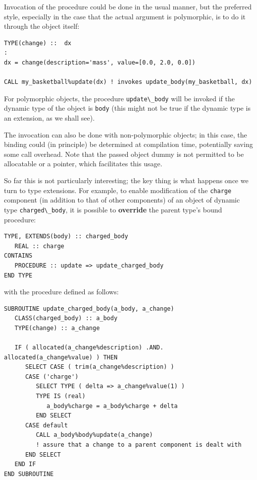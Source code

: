 \documentclass[
  paper=a4,
  ,captions=tableheading
]{scrartcl}
\newcommand{\passthrough}[1]{#1}
\begin{document}
Invocation of the procedure could be done in the usual manner, but the
preferred style, especially in the case that the actual argument is
polymorphic, is to do it through the object itself:

\begin{lstlisting}
TYPE(change) ::  dx
:
dx = change(description='mass', value=[0.0, 2.0, 0.0])

CALL my_basketball%update(dx) ! invokes update_body(my_basketball, dx)
\end{lstlisting}

For polymorphic objects, the procedure
\passthrough{\lstinline!update\_body!} will be invoked if the dynamic
type of the object is \passthrough{\lstinline!body!} (this might not be
true if the dynamic type is an extension, as we shall see).

The invocation can also be done with non-polymorphic objects; in this
case, the binding could (in principle) be determined at compilation
time, potentially saving some call overhead. Note that the passed object
dummy is not permitted to be allocatable or a pointer, which facilitates
this usage.

So far this is not particularly interesting; the key thing is what
happens once we turn to type extensions. For example, to enable
modification of the \passthrough{\lstinline!charge!} component (in
addition to that of other components) of an object of dynamic type
\passthrough{\lstinline!charged\_body!}, it is possible to
\textbf{override} the parent type's bound procedure:

\begin{lstlisting}
TYPE, EXTENDS(body) :: charged_body
   REAL :: charge
CONTAINS
   PROCEDURE :: update => update_charged_body
END TYPE
\end{lstlisting}

with the procedure defined as follows:

\begin{lstlisting}
SUBROUTINE update_charged_body(a_body, a_change)
   CLASS(charged_body) :: a_body
   TYPE(change) :: a_change

   IF ( allocated(a_change%description) .AND. allocated(a_change%value) ) THEN
      SELECT CASE ( trim(a_change%description) )
      CASE ('charge')
         SELECT TYPE ( delta => a_change%value(1) )
         TYPE IS (real)
            a_body%charge = a_body%charge + delta
         END SELECT
      CASE default
         CALL a_body%body%update(a_change)
         ! assure that a change to a parent component is dealt with
      END SELECT
   END IF
END SUBROUTINE
\end{lstlisting}
\end{document}

